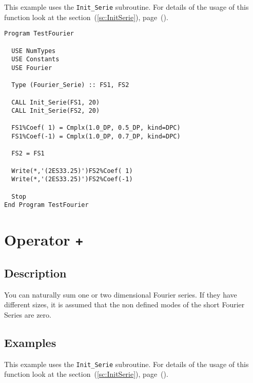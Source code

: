 This example uses the \texttt{Init\_Serie} subroutine. For details of
the usage of this function look at the section~(\ref{sc:InitSerie}),
page~(\pageref{sc:InitSerie}). 

\begin{lstlisting}[emph=Type,
                   emphstyle=\color{blue},
                   frame=trBL,
                   caption=Assigning Fourier series.,
                   label=assignf]
Program TestFourier

  USE NumTypes
  USE Constants
  USE Fourier

  Type (Fourier_Serie) :: FS1, FS2

  CALL Init_Serie(FS1, 20)
  CALL Init_Serie(FS2, 20)

  FS1%Coef( 1) = Cmplx(1.0_DP, 0.5_DP, kind=DPC)
  FS1%Coef(-1) = Cmplx(1.0_DP, 0.7_DP, kind=DPC)

  FS2 = FS1

  Write(*,'(2ES33.25)')FS2%Coef( 1)
  Write(*,'(2ES33.25)')FS2%Coef(-1)

  Stop
End Program TestFourier
\end{lstlisting}

\section{Operator \texttt{+}}

\subsection{Description}

You can naturally sum one or two dimensional Fourier series. If they
have different sizes, it is assumed that the non defined modes of the
short Fourier Series are zero.

\subsection{Examples}

This example uses the \texttt{Init\_Serie} subroutine. For details of
the usage of this function look at the section~(\ref{sc:InitSerie}),
page~(\pageref{sc:InitSerie}). 

